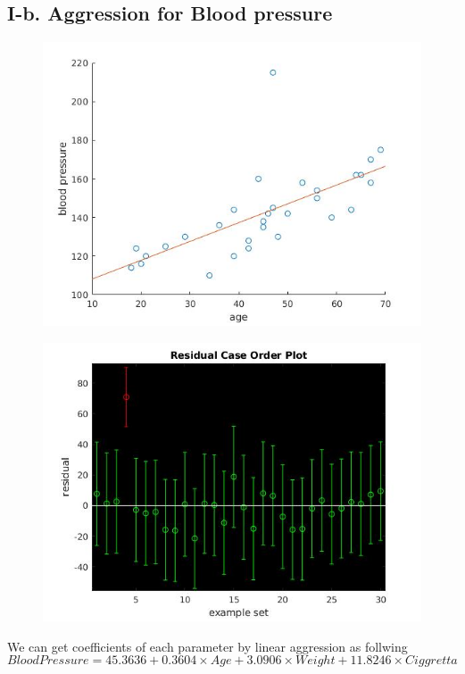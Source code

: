 \documentclass[twoside,a4paper]{article}
\begin{document}
\subsection*{I-b. Aggression for Blood pressure} 
\begin{figure}[H]
\centering
\includegraphics[width=6in]{age2blood.jpg}
\end{figure}

\begin{figure}[H]
\centering
\includegraphics[width=6in]{resdual.jpg}
\end{figure}
We can get coefficients of each parameter by linear aggression as follwing
\begin{equation}
BloodPressure = 45.3636 + 0.3604\times Age + 3.0906\times Weight + 11.8246\times Ciggretta
\end{equation}
\end{document}
